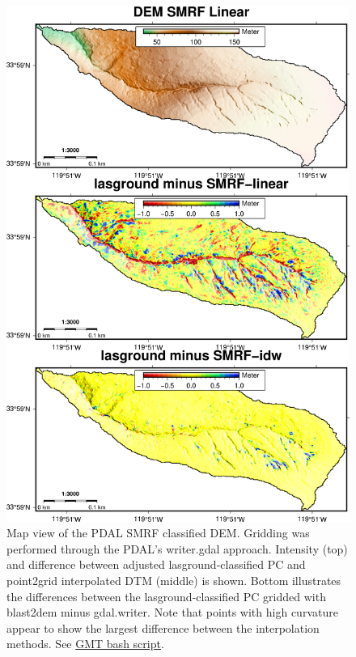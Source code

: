 \documentclass[a4paperpaper,,tablecaptionabove]{scrartcl}
\begin{document}
\begin{figure}
\centering
\includegraphics[width=\textwidth,height=0.85\textheight]{./tex2pdf.-e6884bf2dada0f3b/c1820159b77b07d3eb329d9de1686abfd1d6f527.png}
\caption{Map view of the PDAL SMRF classified DEM. Gridding was
performed through the PDAL's writer.gdal approach. Intensity (top) and
difference between adjusted lasground-classified PC and point2grid
interpolated DTM (middle) is shown. Bottom illustrates the differences
between the lasground-classified PC gridded with blast2dem minus
gdal.writer. Note that points with high curvature appear to show the
largest difference between the interpolation methods. See
\href{https://github.com/BodoBookhagen/PC_geomorph_roughness/blob/master/example_01/example01_create_DEM_PDAL_comparison_ground_classification_gmt.sh}{GMT
bash script}. \label{Fig:Cat16_smrf_PDAL_intensity_diff}}
\end{figure}
\end{document}
